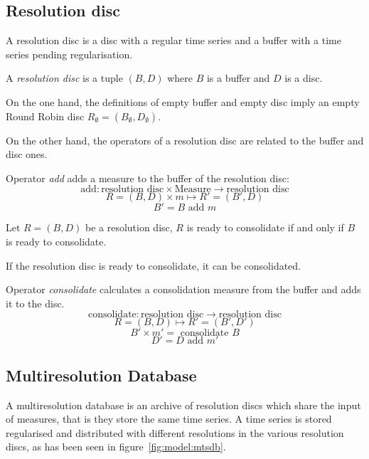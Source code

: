 \subsection{Resolution disc}

A resolution disc is a disc with a regular time series and a buffer
with a time series pending regularisation.

\begin{definition}
  A \emph{resolution disc} is a tuple $(B,D)$ where $B$
  is a buffer and $D$ is a disc.
\end{definition}
 
On the one hand, the definitions of empty buffer and empty disc imply
an empty Round Robin disc $R_{\emptyset} = (B_{\emptyset},D_{\emptyset})$.

On the other hand, the operators of a resolution disc are related to
the buffer and disc ones.

\begin{definition}
  Operator \emph{add} adds a measure  to the buffer of the resolution disc:
  \[
  \text{add}: \text{resolution disc} \times \text{Measure}
  \longrightarrow \text{resolution disc}
  \]
  \[
  R=(B,D) \times m \mapsto R'= (B',D)
  \]
  \[
  B'= B \text{ add } m
  \]
\end{definition}

\begin{definition}
  Let $R=(B,D)$ be a resolution disc, $R$ is ready to consolidate if
  and only if $B$ is ready to consolidate.
\end{definition}

If the resolution disc is ready to consolidate, it can be consolidated.

\begin{definition}
  Operator \emph{consolidate} calculates a consolidation measure from
  the buffer and adds it to the disc.
  \[
  \text{consolidate}: \text{resolution disc} \longrightarrow
  \text{resolution disc}
  \]
  \[
  R=(B,D) \mapsto R'= (B',D')
  \]
  \[
  B' \times m'= \text{ consolidate } B 
  \]
  \[
  D'= D \text{ add } m'
  \]
\end{definition}



\subsection{Multiresolution Database}\label{sec:model:rrd}

A multiresolution database is an archive of resolution discs which
share the input of measures, that is they store the same time
series. A time series is stored regularised and distributed with
different resolutions in the various resolution discs, as has been seen
in figure~\ref{fig:model:mtsdb}.

